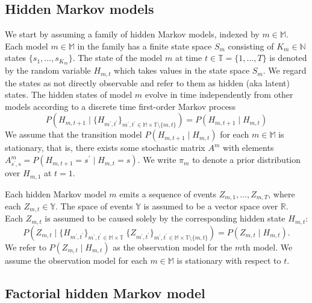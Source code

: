 \documentclass[twoside, 11pt]{article}
\newcommand{\mm}[0] {\mathbb{M}} %
\newcommand{\TT}[0] {\mathbb{T}} %
\newcommand{\reals}[0] {\mathbb{R}}
\newcommand{\naturals}[0] {\mathbb{N}}
\newcommand{\events}[0] {\mathbb{Y}}
\begin{document}
\subsection{Hidden Markov models}
We start by assuming a family of hidden Markov models, indexed by $m \in \mm$. Each model $m \in \mm$ in the family has a finite state space $S_m$ consisting of $K_m \in \naturals$ states $\{s_1, \ldots, s_{K_m}\}$. The state of the model $m$ at time $t \in \TT = \{ 1, \ldots, T \}$ is denoted by the random variable $H_{m, t}$ which takes values in the state space $S_m$. We regard the states as not directly observable and refer to them as hidden (aka latent) states. The hidden states of model $m$ evolve in time independently from other models according to a discrete time first-order Markov process
\begin{equation}
P(H_{m,t+1} \mid \{ H_{m^{\prime},t^{\prime}} \}_{m^{\prime}, t^{\prime} \in \mm \times \TT \setminus \{m, t\}} )
=
P(H_{m,t+1} \mid H_{m,t} )
\end{equation}
We assume that the transition model $P(H_{m,t+1} \mid H_{m,t} )$ for each $m \in \mm$ is stationary, that is, there exists some stochastic matrix $A^{m}$ with elements $A^{m}_{s^{\prime}, s} = P(H_{m, t+1}=s^{\prime} \mid H_{m,t}=s)$. We write $\pi_m$ to denote a prior distribution over $H_{m,1}$ at $t=1$.

Each hidden Markov model $m$ emits a sequence of events $Z_{m,1}, \ldots, Z_{m,T}$, where each $Z_{m,t} \in \events$. The space of events $\events$ is assumed to be a vector space over $\reals$. Each $Z_{m,t}$ is assumed to be caused solely by the corresponding hidden state $H_{m,t}$:
\begin{equation}
P\left(Z_{m,t}
\mid
\{ H_{m^{\prime},t^{\prime}} \}_{m^{\prime}, t^{\prime} \in \mm \times \TT} \;
\{ Z_{m^{\prime},t^{\prime}} \}_{m^{\prime}, t^{\prime} \in \mm \times \TT \setminus \{m, t\}}
\right)
=
P(Z_{m,t} \mid H_{m,t} ) .
\end{equation}
We refer to $P(Z_{m, t} \mid H_{m,t} )$ as the observation model for the $m$th model. We assume the observation model for each $m \in \mm$ is stationary with respect to $t$.

\subsection{Factorial hidden Markov model}
\end{document}
